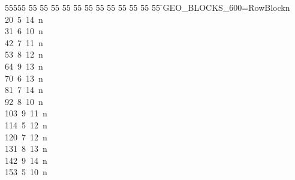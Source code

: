 %
%
\begin{tabbing}
55555 \= 55 \= 55 \= 55 \= 55 \= 55 \= 55 \= 55 \= 55 \= 55 \= 55 \= 55 \= 55 \= \>GEO\_BLOCKS\_600=RowBlockn\\[0pt]
20\ 5\ 14\ n\\[0pt]
31\ 6\ 10\ n\\[0pt]
42\ 7\ 11\ n\\[0pt]
53\ 8\ 12\ n\\[0pt]
64\ 9\ 13\ n\\[0pt]
70\ 6\ 13\ n\\[0pt]
81\ 7\ 14\ n\\[0pt]
92\ 8\ 10\ n\\[0pt]
103\ 9\ 11\ n\\[0pt]
114\ 5\ 12\ n\\[0pt]
120\ 7\ 12\ n\\[0pt]
131\ 8\ 13\ n\\[0pt]
142\ 9\ 14\ n\\[0pt]
153\ 5\ 10\ n\\[0pt]

\end{tabbing}
